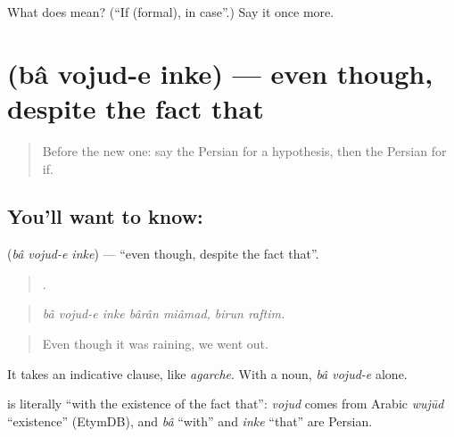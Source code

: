 \begin{tcolorbox}[breakable,colback=teal!4,colframe=teal!35!black,title={Before you move on}]
What does  mean? (\textquotedblleft{}If (formal), in case\textquotedblright{}.) Say it once more.
\end{tcolorbox}
\section[\texorpdfstring{\fa{با} \fa{وجود} \fa{اینکه} (bâ vojud-e inke)}{با وجود اینکه (bâ vojud-e inke)}]{   (bâ vojud-e inke) — even though, despite the fact that}

\label{lesson:FA-C391-ba-vojud-e-inke}



\begin{quote}
Before the new one: say the Persian for a hypothesis, then the Persian for if.
\end{quote}

\subsection*{You'll want to know:   }
\textbf{  } (\emph{bâ vojud-e inke}) — \textquotedblleft{}even though, despite the fact that\textquotedblright{}.

\begin{quote}
      .
\end{quote}

\begin{quote}
\emph{bâ vojud-e inke bârân miâmad, birun raftim.}
\end{quote}

\begin{quote}
Even though it was raining, we went out.
\end{quote}

It takes an indicative clause, like \emph{agarche}. With a noun, \emph{bâ vojud-e} alone.

\begin{cousinweb}
\textbf{  } is literally \textquotedblleft{}with the existence of the fact that\textquotedblright{}: \emph{vojud} comes from Arabic \emph{wujūd} \textquotedblleft{}existence\textquotedblright{} (EtymDB), and \emph{bâ} \textquotedblleft{}with\textquotedblright{} and \emph{inke} \textquotedblleft{}that\textquotedblright{} are Persian.
\end{cousinweb}

